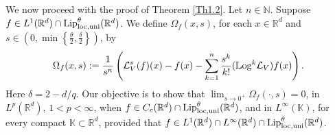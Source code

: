 \documentclass[10pt, a4paper, reqno]{amsart}
\theoremstyle{definition}
\theoremstyle{remark}
\numberwithin{equation}{section}
\begin{document}
We now proceed with the proof of Theorem \ref{Th1.2}. Let $n\in \mathbb N$. Suppose $f\in L^1(\mathbb R^d)\cap {\textup{Lip}}^\theta _{{\rm loc}, {\rm uni}}(\mathbb R^d)$. We define $\Omega_f(x,s)$, for each $x\in \mathbb R^d$ and $s\in (0,\min\left\{\tfrac{\theta}{2},\tfrac{\delta}{2}\right\})$, by
\[
\Omega _f(x,s):=\frac{1}{s^n}\left(\mathcal L_V^s(f)(x)-f(x)-\sum_{k=1}^n\frac{s^k}{k!}(\mathbb{L}\textup{og}^k\mathcal L_V)f(x)\right).
\]
Here $\delta=2-d/q$. Our objective is to show that $\lim_{s\rightarrow 0^+}\Omega_f(\cdot,s)=0$, in $L^p(\mathbb R^d)$, $1<p<\infty$, when $f\in C_c(\mathbb R^d)\cap {\textup{Lip}}_{\textup{loc},\textup{uni}}^\theta (\mathbb R^d)$, and in $L^\infty (\mathbb K)$, for every compact $\mathbb K\subset \mathbb R^d$, provided that $f\in L^1(\mathbb R^d)\cap L^\infty (\mathbb R^d)\cap {\textup{Lip}}_{\textup{loc},\textup{uni}}^\theta (\mathbb R^d)$.
\end{document}
